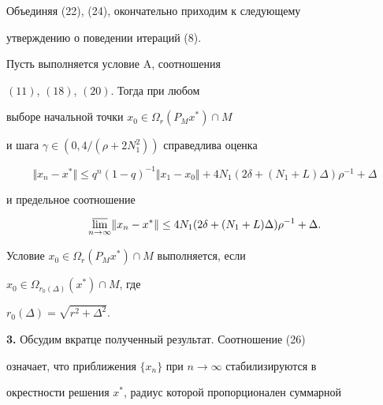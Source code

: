 Объединяя (22), (24), окончательно приходим к следующему


утверждению о поведении итераций (8).





\begin{thmnonum}


Пусть выполняется условие $\mathrm A$, соотношения


$(11)$, $(18)$, $(20)$. Тогда при любом


выборе начальной точки $x_0 \in \Omega_r (P_M x^*) \cap M$


и шага $\gamma \in (0, 4/(\rho+ 2 N_1^2))$ справедлива оценка


\begin{equation}


\Vert x_n-x^* \Vert \leq q^n (1-q)^{-1} \Vert x_1-x_0 \Vert+


4 N_1 (2\delta +(N_1+L) \Delta) \rho^{-1} +\Delta


\end{equation}


и предельное соотношение


\begin{equation}


\underset{n \to \infty}{\varlimsup}{}


\Vert x_n -x^* \Vert \leq


4 N_1 (2\delta +(N_1+L) \Delta) \rho^{-1} +\Delta.


\end{equation}


\end{thmnonum}





\begin{notenonum}


Условие $x_0 \in \Omega_r (P_M x^*) \cap M$ выполняется, если


$x_0 \in \Omega_{r_0 (\Delta)} (x^*) \cap M$, где


$r_0 (\Delta)=\sqrt {r^2 + \Delta^2}$.


\end{notenonum}





{\bf 3.} Обсудим вкратце полученный результат. Соотношение (26) 


означает, что приближения $\{x_n\}$ при $n\to\infty$ стабилизируются в 


окрестности решения $x^*$, радиус которой пропорционален суммарной 


